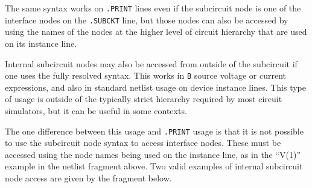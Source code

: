 The same syntax works on \texttt{.PRINT} lines even if the subcircuit
node is one of the interface nodes on the \texttt{.SUBCKT} line, but
those nodes can also be accessed by using the names of the nodes at
the higher level of circuit hierarchy that are used on its instance
line.

\begin{centering}
\end{centering}

Internal subcircuit nodes may also be accessed from outside of the subcircuit
if one uses the fully resolved syntax.  This works in \texttt{B} source voltage or 
current expressions, and also in standard netlist usage on device instance lines.
This type of usage is outside of the typically 
strict hierarchy required by most circuit simulators, but it can be useful in some contexts.

The one difference between this usage and \texttt{.PRINT} usage is that it is not
possible to use the subcircuit node syntax to access interface nodes.
These must be accessed using the node names being used on the instance
line, as in the ``V(1)'' example in the netlist fragment above.  Two valid examples of 
internal subcircuit node access are given by the fragment below.
\begin{centering}
\end{centering}


